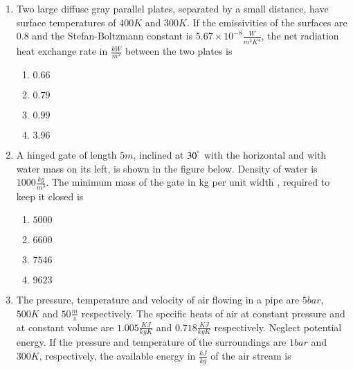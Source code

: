 \documentclass[journal]{IEEEtran}
\numberwithin{equation}{enumi}
\numberwithin{figure}{enumi}
\begin{document}
\begin{enumerate}
    \item 
    Two large diffuse gray parallel plates, separated by a small distance, have surface temperatures of $400 K$ and $300 K$. If the emissivities of the surfaces are $0.8$ and the Stefan-Boltzmann constant is $5.67 \times 10^{-8}\frac{W}{m^2K^4}$, the net radiation heat exchange rate in $\frac{kW}{m^2}$ between the two plates is
    \hfill{}

    \begin{multicols}{4}
        \begin{enumerate}
            \item $0.66$
            \item $0.79$
            \item $0.99$
            \item $3.96$
        \end{enumerate}
    \end{multicols}

    \item 
    A hinged gate of length $5 m$, inclined at $30^\degree$ with the horizontal and with water mass on its left, is shown in the figure below. Density of water is $1000 \frac{kg}{m^3}$. The minimum mass of the gate in kg per unit width , required to keep it closed is

    \begin{figure}[H]
    \centering
    \resizebox{0.7\textwidth}{!}{}
    \end{figure}
    \hfill{}

    \begin{multicols}{4}
        \begin{enumerate}
            \item $5000$
            \item $6600$
            \item $7546$
            \item $9623$
        \end{enumerate}
    \end{multicols}

    \item 
    The pressure, temperature and velocity of air flowing in a pipe are $5 bar$, $500 K$ and $50 \frac{m}{s}$ respectively. The specific heats of air at constant pressure and at constant volume are $1.005 \frac{KJ}{kgK}$ and $0.718 \frac{KJ}{kgK}$ respectively. Neglect potential energy. If the pressure and temperature of the surroundings are $1 bar$ and $300 K$, respectively, the available energy in $\frac{kJ}{kg}$ of the air stream is
    \hfill{}


\end{enumerate}
\end{document}
